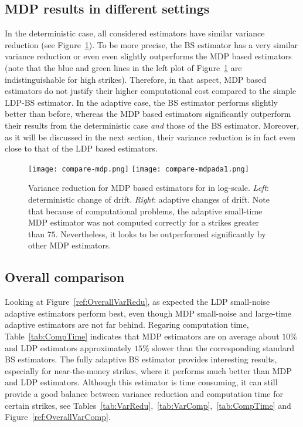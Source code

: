 \documentclass{amsart}[11pt]
\numberwithin{equation}{section}
\numberwithin{theorem}{subsection}
\numberwithin{proposition}{subsection}
\numberwithin{definition}{subsection}
\numberwithin{lemma}{subsection}
\numberwithin{assumption}{subsection}
\begin{document}
\subsection{MDP results in different settings}

In the deterministic case, all considered estimators have similar variance reduction (see Figure~\ref{fig:MDPvarianceRedu}). 
To be more precise, the BS estimator has a very similar variance reduction or even even slightly outperforms the MDP based estimators (note that the blue and green lines in the left plot of Figure~\ref{fig:MDPvarianceRedu} are indistinguishable for high strikes). Therefore, in that aspect, MDP based estimators do not justify their higher computational cost compared to the simple LDP-BS estimator. In the adaptive case, the BS estimator performs slightly better than before, whereas the MDP based estimators significantly outperform their results from the deterministic case \textit{and} those of the BS estimator. Moreover, as it will be discussed in the next section, their variance reduction is in fact even close to that of the LDP based estimators.
\begin{figure}[H]
    \centering
    \texttt{[image: compare-mdp.png]}
    \texttt{[image: compare-mdpada1.png]}
    \caption{Variance reduction for MDP based estimators for in log-scale. \textit{Left}: deterministic change of drift. \textit{Right}: adaptive changes of drift. Note that because of computational problems, the adaptive small-time MDP estimator was not computed correctly for a strikes greater than $75$. Nevertheless, it looks to be outperformed significantly by other MDP estimators.}\label{fig:MDPvarianceRedu}
\end{figure}

\subsection{Overall comparison}

Looking at Figure~\ref{ref:OverallVarRedu}, as expected the LDP small-noise adaptive estimators perform best, even though MDP small-noise and large-time adaptive estimators are not far behind. 
Regaring computation time, Table~\ref{tab:CompTime} indicates that MDP estimators are on average about 
$10\%$  and LDP estimators approximately $15\%$ slower than the corresponding standard BS estimators. 
The fully adaptive BS estimator provides interesting results, especially for near-the-money strikes, 
where it performs much better than MDP and LDP estimators. 
Although this estimator is time consuming, it can still provide a good balance between variance reduction and computation time for certain strikes, see Tables~\ref{tab:VarRedu},~\ref{tab:VarComp},~\ref{tab:CompTime} and Figure~\ref{ref:OverallVarComp}.
\end{document}
